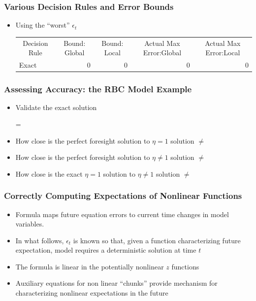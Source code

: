 \documentclass[letter]{beamer}
\begin{document}
\begin{frame}
  \frametitle{Various Decision Rules and Error Bounds}

  \begin{itemize}
  \item Using the ``worst'' $\epsilon_t$
{\tiny
  \begin{tabular}{|l|r|r|r|r|}
    \multicolumn{1}{|c|}{Decision Rule}&
    \multicolumn{1}{|c|}{Bound: Global}&
    \multicolumn{1}{|c|}{Bound: Local}&
    \multicolumn{1}{|c|}{Actual Max Error:Global}&
    \multicolumn{1}{|c|}{Actual Max Error:Local}\\
Exact&0&0&0&0\\
  \end{tabular}
}

  \end{itemize}


\end{frame}


\begin{frame}
  \frametitle{Assessing Accuracy: the RBC Model Example}
  \begin{itemize}
  \item Validate the exact solution

 =
  \item How close is the perfect foresight solution to $\eta=1$ solution
 $\ne$
  \item How close is the perfect foresight solution to $\eta \ne 1$ solution
 $\ne$
  \item How close is the exact $\eta=1$  solution to $\eta \ne 1$ solution
 $\ne$
  \end{itemize}
\end{frame}

\begin{frame}
  \frametitle{Correctly Computing Expectations of Nonlinear Functions}

  \begin{itemize}
  \item Formula maps future equation errors  to current time changes in model
variables.
\item In what follows, $\epsilon_t$ is known so that,
given a function characterizing future expectation,  model requires
a deterministic solution at time $t$
\item The formula is linear in the potentially nonlinear $z$ functions
\item Auxiliary equations for non linear ``chunks'' provide mechanism for characterizing  nonlinear expectations in the future
  \end{itemize}
\end{frame}
\end{document}
